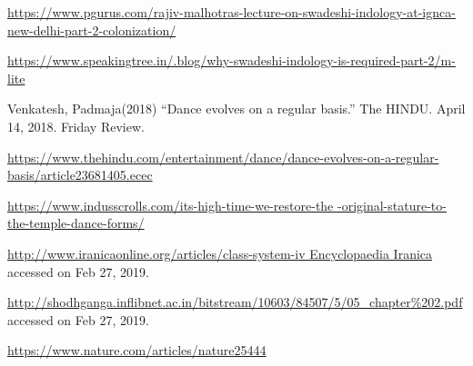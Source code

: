 \begin{thebibliography}{99}
  \url{https://www.pgurus.com/rajiv-malhotras-lecture-on-swadeshi-indology-at-ignca-new-delhi-part-2-colonization/}

  \url{https://www.speakingtree.in/.blog/why-swadeshi-indology-is-required-part-2/m-lite}

  Venkatesh, Padmaja(2018) “Dance evolves on a regular basis.” The HINDU. April 14, 2018. Friday Review.

  \url{https://www.thehindu.com/entertainment/dance/dance-evolves-on-a-regular-basis/article23681405.ecec}

  \url{https://www.indusscrolls.com/its-high-time-we-restore-the -original-stature-to-the-temple-dance-forms/}

  \url{http://www.iranicaonline.org/articles/class-system-iv Encyclopaedia Iranica} accessed on Feb 27, 2019.

  \url{http://shodhganga.inflibnet.ac.in/bitstream/10603/84507/5/05_chapter%202.pdf} accessed on Feb 27, 2019.

  \url{https://www.nature.com/articles/nature25444}

 \end{thebibliography}

\theendnotes

